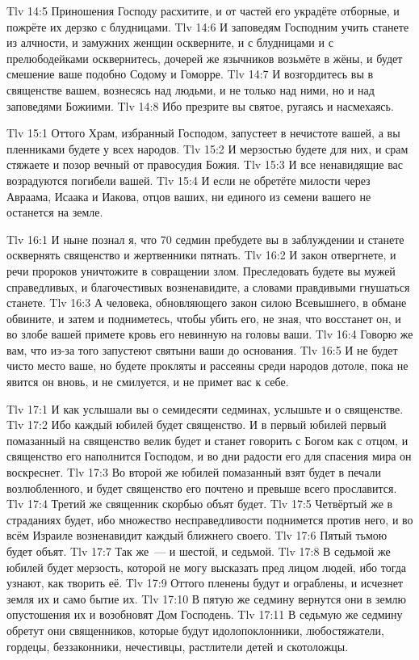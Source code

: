 \vs Tlv 14:5
Приношения Господу расхитите, и от частей его украдёте отборные,
и пожрёте их дерзко с блудницами.
\vs Tlv 14:6
И заповедям Господним учить станете из алчности,
и замужних женщин оскверните,
и с блудницами и с прелюбодейками осквернитесь,
дочерей же язычников возьмёте в жёны,
и будет смешение ваше подобно Содому и Гоморре.
\vs Tlv 14:7
И возгордитесь вы в священстве вашем, вознесясь над людьми,
и не только над ними, но и над заповедями Божиими.
\vs Tlv 14:8
Ибо презрите вы святое, ругаясь и насмехаясь.
 
\vs Tlv 15:1
Оттого Храм, избранный Господом, запустеет в нечистоте вашей,
а вы пленниками будете у всех народов.
\vs Tlv 15:2
И мерзостью будете для них, и срам стяжаете и позор вечный
от правосудия Божия.
\vs Tlv 15:3
И все ненавидящие вас возрадуются погибели вашей.
\vs Tlv 15:4
И если не обретёте милости через Авраама, Исаака и Иакова,
отцов ваших, ни единого из семени вашего не останется на земле.

\vs Tlv 16:1
И ныне познал я, что 70 седмин пребудете вы в заблуждении
и станете осквернять священство и жертвенники пятнать.
\vs Tlv 16:2
И закон отвергнете, и речи пророков уничтожите в совращении злом.
Преследовать будете вы мужей справедливых, и благочестивых возненавидите,
а словами правдивыми гнушаться станете.
\vs Tlv 16:3
А человека, обновляющего закон силою Всевышнего,
в обмане обвините, и затем и подниметесь, чтобы убить его, не зная,
что восстанет он, и во злобе вашей примете кровь его невинную на головы ваши.
\vs Tlv 16:4
Говорю же вам, что из-за того запустеют святыни ваши до основания.
\vs Tlv 16:5
И не будет чисто место ваше, но будете прокляты
и рассеяны среди народов дотоле, пока не явится он вновь,
и не смилуется, и не примет вас к себе.

\vs Tlv 17:1
И как услышали вы о семидесяти седминах, услышьте и о
священстве.
\vs Tlv 17:2
Ибо каждый юбилей будет священство.
И в первый юбилей первый помазанный
на священство велик будет и станет говорить с Богом как с отцом,
и священство его наполнится Господом, и во дни радости его для спасения мира
он воскреснет.
\vs Tlv 17:3
Во второй же юбилей помазанный взят будет в печали возлюбленного,
и будет священство его почтено и превыше всего прославится.
\vs Tlv 17:4
Третий же священник скорбью объят будет.
\vs Tlv 17:5
Четвёртый же в страданиях будет,
ибо множество несправедливости поднимется против него,
и во всём Израиле возненавидит каждый ближнего своего.
\vs Tlv 17:6
Пятый тьмою будет объят.
\vs Tlv 17:7
Так же~--- и шестой, и седьмой.
\vs Tlv 17:8
В седьмой же юбилей будет мерзость,
которой не могу высказать пред лицом людей,
ибо тогда узнают, как творить её.
\vs Tlv 17:9
Оттого пленены будут и ограблены, и исчезнет земля их и само бытие их.
\vs Tlv 17:10
В пятую же седмину вернутся они в землю опустошения
их и возобновят Дом Господень.
\vs Tlv 17:11
В седьмую же седмину обретут они священников,
которые будут идолопоклонники, любостяжатели, гордецы,
беззаконники, нечестивцы, растлители детей и скотоложцы.

